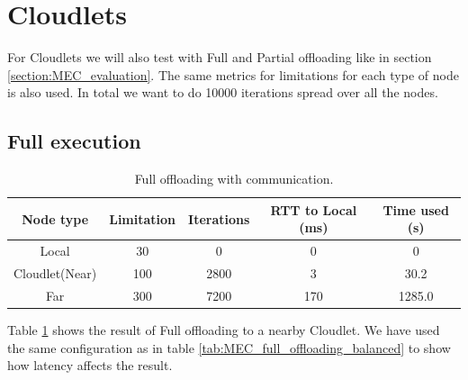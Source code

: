 






\section{Cloudlets}
For Cloudlets we will also test with Full and Partial offloading like in section \ref{section:MEC_evaluation}. The same metrics for limitations for each type of node is also used. In total we want to do 10000 iterations spread over all the nodes.

\subsection{Full execution}
\begin{table}[h!]
    \centering
    \begin{tabular}[c]{|c|c|c|c|c|}
        \hline
        Node type & Limitation & Iterations & RTT to Local (ms)& Time used (s)\\
        \hline
        \hline
        Local           & 30 & 0 & 0 & 0  \\
        \hline
        Cloudlet(Near)  & 100 & 2800 & 3 & 30.2 \\
        \hline
        Far             & 300 & 7200 & 170 & 1285.0 \\
        \hline
    \end{tabular}
    \caption{Full offloading with communication.}
    \label{tab:Cloudlet_full_offloading_latency}
\end{table}
Table \ref{tab:Cloudlet_full_offloading_latency} shows the result of Full offloading to a nearby Cloudlet. We have used the same configuration as in table \ref{tab:MEC_full_offloading_balanced} to show how latency affects the result. 

